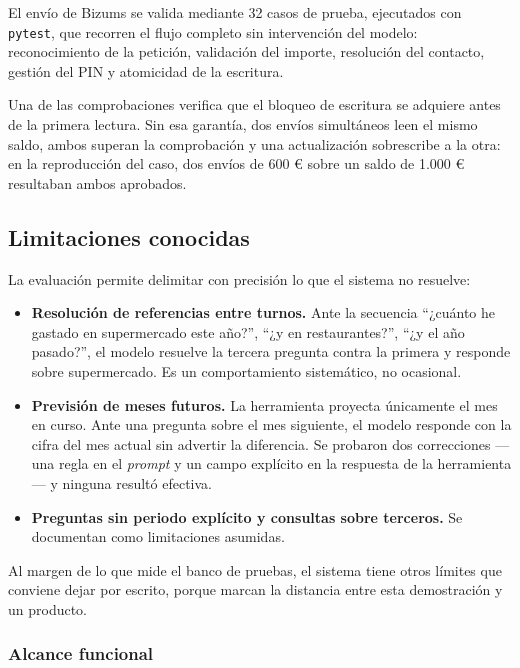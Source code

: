 El envío de Bizums se valida mediante 32 casos de prueba, ejecutados con
\texttt{pytest}, que recorren el flujo completo sin intervención del modelo: reconocimiento de la petición, validación
del importe, resolución del contacto, gestión del PIN y atomicidad de la
escritura.

Una de las comprobaciones verifica que el bloqueo de escritura se adquiere antes
de la primera lectura. Sin esa garantía, dos envíos simultáneos leen el mismo
saldo, ambos superan la comprobación y una actualización sobrescribe a la otra:
en la reproducción del caso, dos envíos de 600 € sobre un saldo de 1.000 €
resultaban ambos aprobados.

\subsection{Limitaciones conocidas}

La evaluación permite delimitar con precisión lo que el sistema no resuelve:

\begin{itemize}
    \item \textbf{Resolución de referencias entre turnos.} Ante la secuencia
    ``¿cuánto he gastado en supermercado este año?'', ``¿y en restaurantes?'',
    ``¿y el año pasado?'', el modelo resuelve la tercera pregunta contra la
    primera y responde sobre supermercado. Es un comportamiento sistemático, no
    ocasional.

    \item \textbf{Previsión de meses futuros.} La herramienta proyecta
    únicamente el mes en curso. Ante una pregunta sobre el mes siguiente, el
    modelo responde con la cifra del mes actual sin advertir la diferencia. Se
    probaron dos correcciones —una regla en el \textit{prompt} y un campo
    explícito en la respuesta de la herramienta— y ninguna resultó efectiva.

    \item \textbf{Preguntas sin periodo explícito y consultas sobre terceros.}
    Se documentan como limitaciones asumidas.
\end{itemize}

Al margen de lo que mide el banco de pruebas, el sistema tiene otros límites
que conviene dejar por escrito, porque marcan la distancia entre esta
demostración y un producto.

\subsubsection{Alcance funcional}

